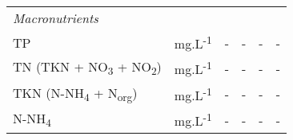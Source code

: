 \begin{table}[]
\begin{tabular}{llcccc}
\textit{Macronutrients} \\
TP              & mg.L\textsuperscript{-1}                           & -                                      & -                                      & -                                    & -                                      \\
TN (TKN + NO\textsubscript{3} + NO\textsubscript{2})                 & mg.L\textsuperscript{-1}                           & -                                      & -                                      & -                                    & -                                      \\
TKN (N-NH\textsubscript{4} + N\textsubscript{org})                     & mg.L\textsuperscript{-1}                           & -                                      & -                                      & -                                    & -                                      \\
N-NH\textsubscript{4}                    & mg.L\textsuperscript{-1}                           & -                                      & -                                      & -                                    & -                                     
\end{tabular}
\end{table}